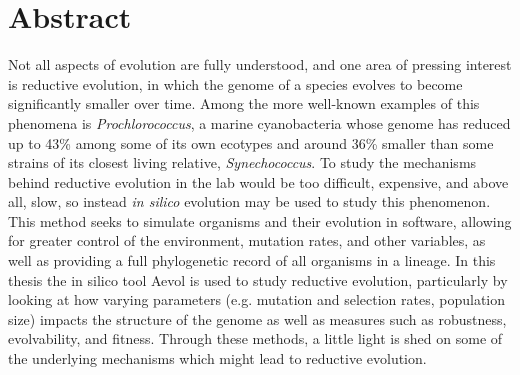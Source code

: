 




%
\newpage

\chapter*{Abstract}
Not all aspects of evolution are fully understood, and one area of pressing interest is reductive evolution, in which the genome of a species evolves to become significantly smaller over time. Among the more well-known examples of this phenomena is \textit{Prochlorococcus}, a marine cyanobacteria whose genome has reduced up to 43\% among some of its own ecotypes and around 36\% smaller than some strains of its closest living relative, \textit{Synechococcus}. To study the mechanisms behind reductive evolution in the lab would be too difficult, expensive, and above all, slow, so instead \textit{in silico} evolution may be used to study this phenomenon. This method seeks to simulate organisms and their evolution in software, allowing for greater control of the environment, mutation rates, and other variables, as well as providing a full phylogenetic record of all organisms in a lineage. In this thesis the in silico tool Aevol is used to study reductive evolution, particularly by looking at how varying parameters (e.g. mutation and selection rates, population size) impacts the structure of the genome as well as measures such as robustness, evolvability, and fitness. Through these methods, a little light is shed on some of the underlying mechanisms which might lead to reductive evolution. 



\linespread{1.25}\selectfont

\tableofcontents
{}
\listoffigures  
\listoftables
\blankpage





%

